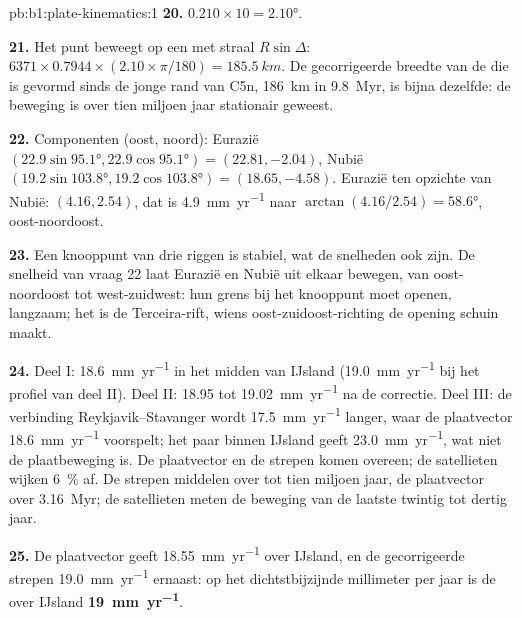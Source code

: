 \begin{solution}{pb:b1:plate-kinematics:1}
\textbf{20.} $0.210\times10 = \ang{2.10}$.

\textbf{21.} Het punt beweegt op een  met straal $R\sin\Delta$:
$6371\times0.7944\times(2.10\times\pi/180) = \qty{185.5}{km}$. De gecorrigeerde breedte van de  die is gevormd sinds de jonge rand van C5n, \qty{186}{km} in \qty{9.8}{Myr}, is bijna dezelfde: de beweging is over tien miljoen jaar stationair geweest.

\textbf{22.} Componenten (oost, noord): Eurazië
$(22.9\sin\ang{95.1}, 22.9\cos\ang{95.1}) = (22.81, -2.04)$, Nubië
$(19.2\sin\ang{103.8}, 19.2\cos\ang{103.8}) = (18.65, -4.58)$. Eurazië ten opzichte
van Nubië: $(4.16, 2.54)$, dat is \qty{4.9}{mm.yr^{-1}} naar
$\arctan(4.16/2.54) = \ang{58.6}$, oost-noordoost.

\textbf{23.} Een knooppunt van drie riggen is stabiel, wat de snelheden ook zijn. De snelheid van vraag 22 laat Eurazië en Nubië uit elkaar bewegen, van oost-noordoost tot west-zuidwest: hun grens bij het knooppunt moet openen, langzaam; het is de Terceira-rift, wiens oost-zuidoost-richting de opening schuin maakt.

\textbf{24.} Deel I: \qty{18.6}{mm.yr^{-1}} in het midden van IJsland (\qty{19.0}{mm.yr^{-1}} bij het profiel van deel II). Deel II: 18.95 tot \qty{19.02}{mm.yr^{-1}} na de correctie. Deel III: de verbinding Reykjavik–Stavanger wordt \qty{17.5}{mm.yr^{-1}} langer, waar de plaatvector \qty{18.6}{mm.yr^{-1}} voorspelt; het paar binnen IJsland geeft \qty{23.0}{mm.yr^{-1}}, wat niet de plaatbeweging is. De plaatvector en de strepen komen overeen; de satellieten wijken \qty{6}{\percent} af. De strepen middelen over tot tien miljoen jaar, de plaatvector over \qty{3.16}{Myr}; de satellieten meten de beweging van de laatste twintig tot dertig jaar.

\textbf{25.} De plaatvector geeft \qty{18.55}{mm.yr^{-1}} over IJsland, en de gecorrigeerde strepen \qty{19.0}{mm.yr^{-1}} ernaast: op het dichtstbijzijnde millimeter per jaar is de  over IJsland \textbf{\qty[text-series-to-math=true]{19}{mm.yr^{-1}}}.
\end{solution}
